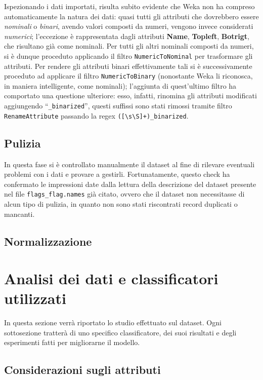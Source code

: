 \documentclass[a4paper,11pt,twoside,notitlepage,final]{scrartcl}
\begin{document}
Ispezionando i dati importati, risulta subito evidente che Weka non ha compreso automaticamente la natura dei dati:
quasi tutti gli attributi che dovrebbero essere \emph{nominali} o \emph{binari}, avendo valori composti da numeri, vengono invece considerati \emph{numerici}; l'eccezione
è rappresentata dagli attributi \textbf{Name}, \textbf{Topleft}, \textbf{Botrigt}, che risultano già come nominali.
Per tutti gli altri nominali composti da numeri, si è dunque proceduto applicando il filtro \texttt{NumericToNominal}
per trasformare gli attributi. Per rendere gli attributi binari
effettivamente tali si è successivamente proceduto ad applicare il filtro \texttt{NumericToBinary}
(nonostante Weka li riconosca, in maniera intelligente, come nominali); l'aggiunta di quest'ultimo
filtro ha comportato una questione ulteriore: esso, infatti, rinomina gli attributi modificati aggiungendo
``\texttt{\_binarized}'', questi suffissi sono stati rimossi tramite filtro \texttt{RenameAttribute}
passando la regex \verb|([\s\S]+)_binarized|.

\subsection{Pulizia}

In questa fase si è controllato manualmente il dataset al fine di rilevare eventuali problemi con i dati e provare a gestirli.
Fortunatamente, questo check ha confermato le impressioni date dalla lettura della descrizione del dataset presente
nel file \texttt{flags\_flag.names} già citato, ovvero che il dataset non necessitasse di alcun tipo di pulizia, in quanto
non sono stati riscontrati record duplicati o mancanti.

\subsection{Normalizzazione}

\section{Analisi dei dati e classificatori utilizzati}

In questa sezione verrà riportato lo studio effettuato sul dataset.
Ogni sottosezione tratterà di uno specifico classificatore, dei suoi risultati e degli esperimenti fatti per migliorarne il modello.

\subsection{Considerazioni sugli attributi}
\end{document}
